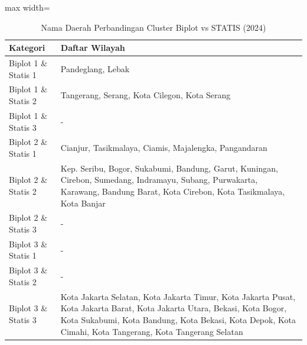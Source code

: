 \begin{table}[H]
\centering
\caption{Nama Daerah Perbandingan Cluster Biplot vs STATIS (2024)} \label{tab:appbiplot_statis_comp_name_2024}
\begin{adjustbox}{max width=\textwidth}
\begin{tabular}{|p{4cm}|p{10cm}|}
\hline
\textbf{Kategori} & \textbf{Daftar Wilayah} \\
\hline
Biplot 1 \& Statis 1 & Pandeglang, Lebak \\
\hline
Biplot 1 \& Statis 2 & Tangerang, Serang, Kota Cilegon, Kota Serang \\
\hline
Biplot 1 \& Statis 3 & - \\
\hline
Biplot 2 \& Statis 1 & Cianjur, Tasikmalaya, Ciamis, Majalengka, Pangandaran \\
\hline
Biplot 2 \& Statis 2 & Kep. Seribu, Bogor, Sukabumi, Bandung, Garut, Kuningan, Cirebon, Sumedang, Indramayu, Subang, Purwakarta, Karawang, Bandung Barat, Kota Cirebon, Kota Tasikmalaya, Kota Banjar \\
\hline
Biplot 2 \& Statis 3 & - \\
\hline
Biplot 3 \& Statis 1 & - \\
\hline
Biplot 3 \& Statis 2 & - \\
\hline
Biplot 3 \& Statis 3 & Kota Jakarta Selatan, Kota Jakarta Timur, Kota Jakarta Pusat, Kota Jakarta Barat, Kota Jakarta Utara, Bekasi, Kota Bogor, Kota Sukabumi, Kota Bandung, Kota Bekasi, Kota Depok, Kota Cimahi, Kota Tangerang, Kota Tangerang Selatan \\
\hline
\end{tabular}
\end{adjustbox}
\end{table}